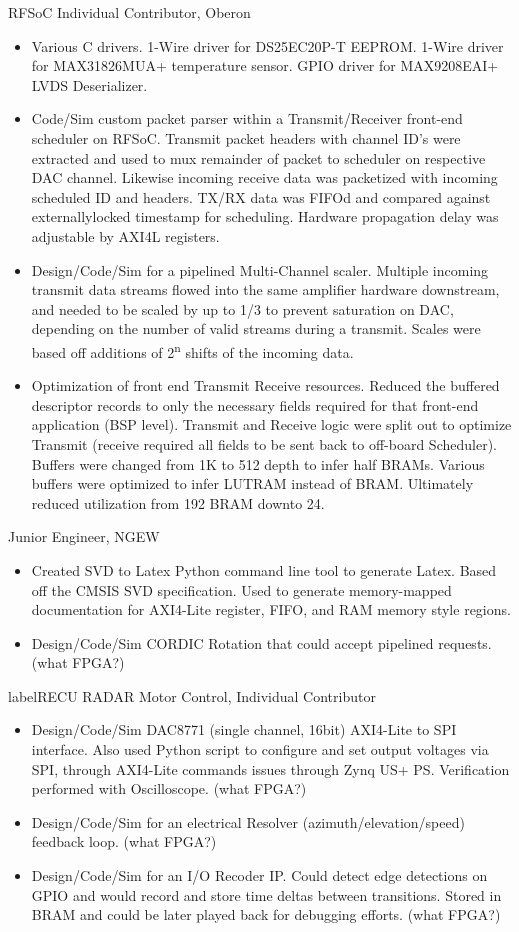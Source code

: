 \documentclass[10pt,final,sans]{resume}
\begin{document}
RFSoC Individual Contributor, Oberon 
\begin{itemize}
  \item Various C drivers. 1-Wire driver for DS25EC20P-T EEPROM. 1-Wire driver for MAX31826MUA+ temperature sensor. GPIO driver for MAX9208EAI+ LVDS Deserializer.
  \item Code/Sim custom packet parser within a Transmit/Receiver front-end scheduler on RFSoC. Transmit packet headers with channel ID's were extracted and used to mux remainder of packet to scheduler on respective DAC channel. Likewise incoming receive data was packetized with incoming scheduled ID and headers. TX/RX data was FIFOd and compared against externallylocked timestamp for scheduling. Hardware propagation delay was adjustable by AXI4L registers.
  \item Design/Code/Sim for a pipelined Multi-Channel scaler. Multiple incoming transmit data streams flowed into the same amplifier hardware downstream, and needed to be scaled by up to 1/3 to prevent saturation on DAC, depending on the number of valid streams during a transmit. Scales were based off additions of 2\textsuperscript{n} shifts of the incoming data.
  \item Optimization of front end Transmit Receive resources. Reduced the buffered descriptor records to only the necessary fields required for that front-end application (BSP level). Transmit and Receive logic were split out to optimize Transmit (receive required all fields to be sent back to off-board Scheduler). Buffers were changed from 1K to 512 depth to infer half BRAMs. Various buffers were optimized to infer LUTRAM instead of BRAM. Ultimately reduced utilization from 192 BRAM downto 24.
\end{itemize}


  Junior Engineer, NGEW 
  \begin{itemize}
    \item Created SVD to Latex Python command line tool to generate Latex. Based off the CMSIS SVD specification. Used to generate memory-mapped documentation for AXI4-Lite register, FIFO, and RAM memory style regions.
    \item Design/Code/Sim CORDIC Rotation that could accept pipelined requests. (what FPGA?)
  \end{itemize}

  label{RECU}
  RADAR Motor Control, Individual Contributor
  \begin{itemize}
    \item Design/Code/Sim DAC8771 (single channel, 16bit) AXI4-Lite to SPI interface. Also used Python script to configure and set output voltages via SPI, through AXI4-Lite commands issues through Zynq US+ PS. Verification performed with Oscilloscope. (what FPGA?)
    \item Design/Code/Sim for an electrical Resolver (azimuth/elevation/speed) feedback loop. (what FPGA?)
    \item Design/Code/Sim for an I/O Recoder IP. Could detect edge detections on GPIO and would record and store time deltas between transitions. Stored in BRAM and could be later played back for debugging efforts. (what FPGA?)
  \end{itemize}
\end{document}
